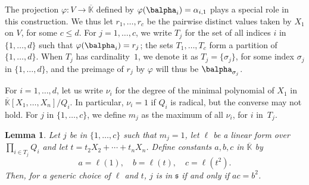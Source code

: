 \documentclass[12pt]{article}
\def\Kbar {{\ensuremath{\overline{\mathbb{K}}}}}
\newtheorem{Lemma}{Lemma}
\begin{document}
The projection $\varphi: V \to \Kbar$ defined by
$\varphi(\balpha_i)=\alpha_{i,1}$ plays a special role in this
construction.  We thus let $r_1,\dots,r_c$ be the pairwise distinct
values taken by $X_1$ on $V$, for some $c \le d$.  For
$j=1,\dots,c$, we write $T_j$ for the set of all indices $i$ in
$\{1,\dots,d\}$ such that $\varphi(\balpha_{i})=r_j$; the sets
$T_1,\dots,T_c$ form a partition of $\{1,\dots,d\}$. When $T_j$ has
cardinality~$1$, we denote it as $T_j=\{\sigma_j\}$, for some index
$\sigma_j$ in $\{1,\dots,d\}$, and the preimage of $r_j$ by $\varphi$
will thus be $\balpha_{\sigma_j}$.


For $i=1,\dots,d$, let us write $\nu_i$ for the degree of the minimal
polynomial of $X_1$ in $\Kbar[X_1,\dots,X_n]/Q_i$.  In particular,
$\nu_i=1$ if $Q_i$ is radical, but the converse may not hold.  For $j$
in $\{1,\dots,c\}$, we define $m_j$ as the maximum of all $\nu_i$, for
$i$ in~$T_j$.  
\begin{Lemma}
  Let $j$ be in $\{1,\dots,c\}$ such that $m_j=1$, let $\ell$ be a
  linear form over $\prod_{i \in T_j} Q_i$ and let $t=t_2 X_2
  + \cdots + t_n X_n$. Define constants $a,b,c$ in $\Kbar$ by
  $$a=\ell(1),\quad b=\ell(t),\quad c=\ell(t^2).$$
  Then, for a generic choice of $\ell$ and $t$, $j$ is in $\mathfrak{s}$
  if and only if $ac=b^2$.
\end{Lemma}
\end{document}
